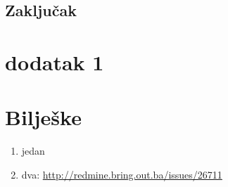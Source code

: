 \documentclass[times, utf8, seminar]{fit}
\begin{document}
\section{Zaključak}




\appendix

\chapter{dodatak 1}
\label{chap:dodatak1}

\chapter{Bilješke}
\label{chap:biljeske}

\begin{enumerate}
  \item jedan
  \item dva: \url{http://redmine.bring.out.ba/issues/26711}
\end{enumerate}
\end{document}
